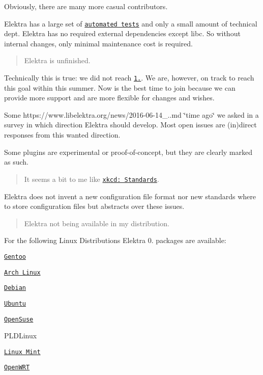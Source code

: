 Obviously, there are many more casual contributors.

Elektra has a large set of \href{https://build.libelektra.org}{\tt automated tests} and only a small amount of technical dept. Elektra has no required external dependencies except libc. So without internal changes, only minimal maintenance cost is required.

\begin{quote}
Elektra is unfinished. \end{quote}


Technically this is true\+: we did not reach \href{https://git.libelektra.org/milestone/12}{\tt 1.}. We are, however, on track to reach this goal within this summer. Now is the best time to join because we can provide more support and are more flexible for changes and wishes.

Some https\+://www.libelektra.\+org/news/2016-\/06-\/14\+\_..\+md \char`\"{}time ago\char`\"{} we asked in a survey in which direction Elektra should develop. Most open issues are (in)direct responses from this wanted direction.

Some plugins are experimental or proof-\/of-\/concept, but they are clearly marked as such.

\begin{quote}
It seems a bit to me like \href{https://xkcd.com/927/}{\tt xkcd\+: Standards}. \end{quote}


Elektra does not invent a new configuration file format nor new standards where to store configuration files but abstracts over these issues.

\begin{quote}
Elektra not being available in my distribution. \end{quote}


For the following Linux Distributions Elektra 0. packages are available\+:


\begin{DoxyItemize}
\item \href{http://packages.gentoo.org/package/app-admin/elektra}{\tt Gentoo}
\item \href{https://aur.archlinux.org/packages/elektra/}{\tt Arch Linux}
\item \href{https://packages.debian.org/de/jessie/libelektra4}{\tt Debian}
\item \href{https://launchpad.net/ubuntu/+source/elektra}{\tt Ubuntu}
\item \href{https://software.opensuse.org/package/elektra}{\tt Open\+Suse}
\item P\+L\+D\+Linux
\item \href{https://community.linuxmint.com/software/view/elektra-bin}{\tt Linux Mint}
\item \href{https://openwrt.org/packages/pkgdata/libelektra-core?s[]=elektra}{\tt Open\+W\+RT}
\end{DoxyItemize}

